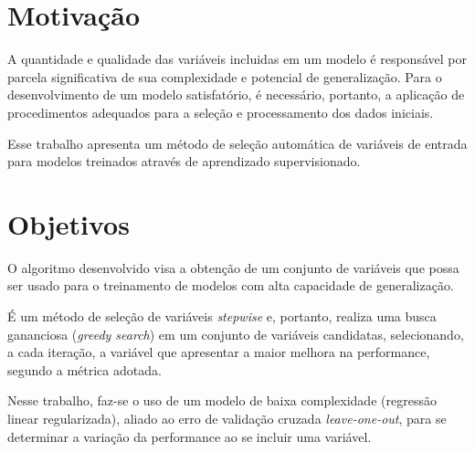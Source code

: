 \section{Motivação}
A quantidade e qualidade das variáveis incluidas em um modelo é responsável por parcela significativa de sua complexidade e potencial de generalização. Para o desenvolvimento de um modelo satisfatório, é necessário, portanto, a aplicação de procedimentos adequados para a seleção e processamento dos dados iniciais.

Esse trabalho apresenta um método de seleção automática de variáveis de entrada para modelos treinados através de aprendizado supervisionado.

\section{Objetivos}

 O algoritmo desenvolvido visa a obtenção de um conjunto de variáveis que possa ser usado para o treinamento de modelos com alta capacidade de generalização. 
 
 É um método de seleção de variáveis \textit{stepwise} e, portanto, realiza uma busca gananciosa (\textit{greedy search}) em um conjunto de variáveis candidatas, selecionando, a cada iteração, a variável que apresentar a maior melhora na performance, segundo a métrica adotada.
 
Nesse trabalho, faz-se o uso de um modelo de baixa complexidade (regressão linear regularizada), aliado ao erro de validação cruzada \textit{leave-one-out}, para se determinar a variação da performance ao se incluir uma variável.